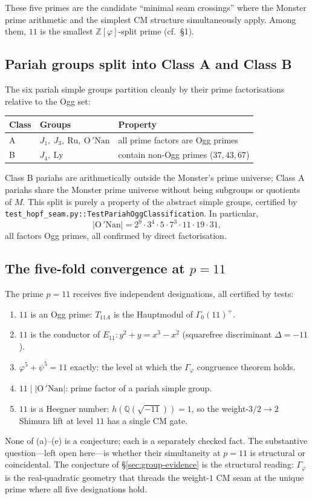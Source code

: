 \documentclass[11pt,a4paper]{article}
\theoremstyle{plain}
\theoremstyle{definition}
\theoremstyle{remark}
\numberwithin{equation}{section}
\providecommand{\Zp}{\ensuremath{\mathbb{Z}[\varphi]}}
\providecommand{\Gphi}{\ensuremath{\Gamma_{\varphi}}}
\begin{document}
These five primes are the candidate ``minimal seam crossings'' where the Monster
prime arithmetic and the simplest CM structure simultaneously apply.  Among
them, $11$ is the smallest $\Zp$-split prime (cf.\ \S1).

\subsection*{Pariah groups split into Class A and Class B}

The six pariah simple groups partition cleanly by their prime factorisations
relative to the Ogg set:
\begin{center}
\begin{tabular}{@{}lll@{}}\hline
\textbf{Class} & \textbf{Groups} & \textbf{Property} \\\hline
A & $J_{1},\ J_{3},\ \mathrm{Ru},\ \mathrm{O\,'\!Nan}$
  & all prime factors are Ogg primes \\
B & $J_{4},\ \mathrm{Ly}$
  & contain non-Ogg primes ($37,43,67$) \\\hline
\end{tabular}
\end{center}
Class B pariahs are arithmetically outside the Monster's prime universe; Class A
pariahs share the Monster prime universe without being subgroups or quotients
of $M$.  This split is purely a property of the abstract simple groups, certified
by \texttt{test\_hopf\_seam.py::TestPariahOggClassification}.  In particular,
\[
  |\mathrm{O\,'\!Nan}| = 2^{9}\cdot 3^{4}\cdot 5\cdot 7^{3}\cdot 11\cdot 19\cdot 31,
\]
all factors Ogg primes, all confirmed by direct factorisation.

\subsection*{The five-fold convergence at $p=11$}

The prime $p=11$ receives five independent designations, all certified by tests:
\begin{enumerate}
\item[(a)] $11$ is an Ogg prime: $T_{11A}$ is the Hauptmodul of $\Gamma_{0}(11)^{+}$.
\item[(b)] $11$ is the conductor of $E_{11}: y^{2}+y=x^{3}-x^{2}$ (squarefree
           discriminant $\Delta=-11$).
\item[(c)] $\varphi^{5}+\psi^{5}=11$ exactly: the level at which the
           $\Gphi$ congruence theorem holds.
\item[(d)] $11\mid|\mathrm{O\,'\!Nan}|$: prime factor of a pariah simple group.
\item[(e)] $11$ is a Heegner number: $h(\mathbb{Q}(\sqrt{-11}))=1$, so the
           weight-$3/2\to 2$ Shimura lift at level $11$ has a single CM gate.
\end{enumerate}
None of (a)--(e) is a conjecture; each is a separately checked fact.  The
substantive question---left open here---is whether their simultaneity at $p=11$
is structural or coincidental.  The conjecture of \S\ref{sec:group-evidence} is
the structural reading: $\Gphi$ is the real-quadratic geometry that threads the
weight-$1$ CM seam at the unique prime where all five designations hold.
\end{document}
